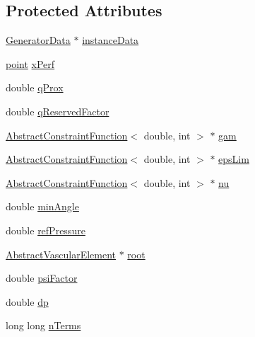 \subsection*{Protected Attributes}
\begin{DoxyCompactItemize}
\item 
\hyperlink{class_generator_data}{Generator\+Data} $\ast$ \hyperlink{class_abstract_object_c_c_o_tree_aca7aecbd89dadc46dd9dce14cfde31e1}{instance\+Data}
\item 
\hyperlink{structpoint}{point} \hyperlink{class_abstract_object_c_c_o_tree_a6b9a8b8d2ba28beba61fe94f9028767c}{x\+Perf}
\item 
double \hyperlink{class_abstract_object_c_c_o_tree_a95cecfb158b008159b0885e4f434046f}{q\+Prox}
\item 
double \hyperlink{class_abstract_object_c_c_o_tree_aa7724194ea9aaa23352a459feaa8c38f}{q\+Reserved\+Factor}
\item 
\hyperlink{class_abstract_constraint_function}{Abstract\+Constraint\+Function}$<$ double, int $>$ $\ast$ \hyperlink{class_abstract_object_c_c_o_tree_aad315b93744637e18153c4434dac067d}{gam}
\item 
\hyperlink{class_abstract_constraint_function}{Abstract\+Constraint\+Function}$<$ double, int $>$ $\ast$ \hyperlink{class_abstract_object_c_c_o_tree_a62d3e1ff7e74a6236422273f58fc6012}{eps\+Lim}
\item 
\hyperlink{class_abstract_constraint_function}{Abstract\+Constraint\+Function}$<$ double, int $>$ $\ast$ \hyperlink{class_abstract_object_c_c_o_tree_a92e6b6d1a2fac7331eee34fb28158828}{nu}
\item 
double \hyperlink{class_abstract_object_c_c_o_tree_a254b7d92f417613be6019031a0afb63d}{min\+Angle}
\item 
double \hyperlink{class_abstract_object_c_c_o_tree_ae7215e6237e4d04625a0c96be9f3578d}{ref\+Pressure}
\item 
\hyperlink{class_abstract_vascular_element}{Abstract\+Vascular\+Element} $\ast$ \hyperlink{class_abstract_object_c_c_o_tree_ae1b17938ad34d92629915159c49bb89a}{root}
\item 
double \hyperlink{class_abstract_object_c_c_o_tree_ad29145c32f075e9c9db3cf1bd2a97b28}{psi\+Factor}
\item 
double \hyperlink{class_abstract_object_c_c_o_tree_adfeb609a44be72e7894d09149ed40f3c}{dp}
\item 
long long \hyperlink{class_abstract_object_c_c_o_tree_ad6c998c6ee999126718ca75cf7eeea0e}{n\+Terms}
\item 

\end{DoxyCompactItemize}
